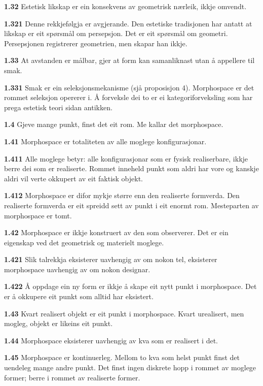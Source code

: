 \documentclass[11pt, a4paper]{article}
\newcommand{\subprop}[1]{\medskip\noindent\textbf{#1}\quad}
\begin{document}
\subprop{1.32} Estetisk likskap er ein konsekvens av geometrisk n\ae rleik, ikkje omvendt.

\subprop{1.321} Denne rekkjef\o lgja er avgjerande. Den estetiske tradisjonen har antatt at likskap er eit sp\o rsm\aa l om persepsjon. Det er eit sp\o rsm\aa l om geometri. Persepsjonen registrerer geometrien, men skapar han ikkje.

\subprop{1.33} At avstanden er m\aa lbar, gjer at form kan samanliknast utan \aa{} appellere til smak.

\subprop{1.331} Smak er ein seleksjonsmekanisme (sj\aa{} proposisjon 4). Morphospace er det rommet seleksjon opererer i. \AA{} forveksle dei to er ei kategoriforveksling som har prega estetisk teori sidan antikken.

\subprop{1.4} Gjeve mange punkt, finst det eit rom. Me kallar det morphospace.

\subprop{1.41} Morphospace er totaliteten av alle moglege konfigurasjonar.

\subprop{1.411} \guillemotleft Alle moglege\guillemotright{} betyr: alle konfigurasjonar som er fysisk realiserbare, ikkje berre dei som er realiserte. Rommet inneheld punkt som aldri har vore og kanskje aldri vil verte okkupert av eit faktisk objekt.

\subprop{1.412} Morphospace er difor mykje st\o rre enn den realiserte formverda. Den realiserte formverda er eit spreidd sett av punkt i eit enormt rom. Mesteparten av morphospace er tomt.

\subprop{1.42} Morphospace er ikkje konstruert av den som observerer. Det er ein eigenskap ved det geometrisk og materielt moglege.

\subprop{1.421} Slik talrekkja eksisterer uavhengig av om nokon tel, eksisterer morphospace uavhengig av om nokon designar.

\subprop{1.422} \AA{} oppdage ein ny form er ikkje \aa{} skape eit nytt punkt i morphospace. Det er \aa{} okkupere eit punkt som alltid har eksistert.

\subprop{1.43} Kvart realisert objekt er eit punkt i morphospace. Kvart urealisert, men mogleg, objekt er likeins eit punkt.

\subprop{1.44} Morphospace eksisterer uavhengig av kva som er realisert i det.

\subprop{1.45} Morphospace er kontinuerleg. Mellom to kva som helst punkt finst det uendeleg mange andre punkt. Det finst ingen diskrete hopp i rommet av moglege former; berre i rommet av realiserte former.
\end{document}
